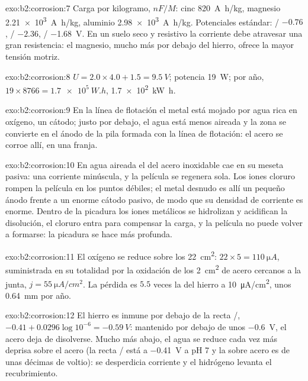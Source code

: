 \begin{solution}{exo:b2:corrosion:7}
Carga por kilogramo, $nF/M$: cinc \qty{820}{A.h/kg}, magnesio \qty{2.21e3}{A.h/kg},
aluminio \qty{2.98e3}{A.h/kg}. Potenciales estándar: / $-0.76$,
/ $-2.36$, / \qty{-1.68}{V}. En un suelo seco y resistivo
la corriente debe atravesar una gran resistencia: el magnesio, mucho más
por debajo del hierro, ofrece la mayor tensión motriz.
\end{solution}

\begin{solution}{exo:b2:corrosion:8}
$U = 2.0 \times 4.0 + 1.5 = \qty{9.5}{V}$; potencia \qty{19}{W}; por año, $19 \times
8766 = \qty{1.7e5}{W.h}$, \qty{1.7e2}{kW.h}.
\end{solution}

\begin{solution}{exo:b2:corrosion:9}
En la línea de flotación el metal está mojado por agua rica en oxígeno, un cátodo; justo
por debajo, el agua está menos aireada y la zona se convierte en el ánodo de la pila
formada con la línea de flotación: el acero se corroe allí, en una franja.
\end{solution}

\begin{solution}{exo:b2:corrosion:10}
En agua aireada el  del acero inoxidable cae en su
meseta pasiva: una corriente minúscula, y la película se regenera sola. Los iones cloruro rompen
la película en los puntos débiles; el metal desnudo es allí un pequeño ánodo frente a un
enorme cátodo pasivo, de modo que su densidad de corriente es enorme. Dentro de la picadura los
iones metálicos se hidrolizan y acidifican la disolución, el cloruro entra para compensar
la carga, y la película no puede volver a formarse: la picadura se hace más profunda.
\end{solution}

\begin{solution}{exo:b2:corrosion:11}
El oxígeno se reduce sobre los \qty{22}{cm^2}:  $22 \times 5 =
\qty{110}{\micro A}$, suministrada en su totalidad por la oxidación de los \qty{2}{cm^2} de acero
cercanos a la junta, $j = \qty{55}{\micro A/cm^2}$. La pérdida es $5.5$ veces la del hierro
a \qty{10}{\micro A/cm^2}, unos \qty{0.64}{mm} por año.
\end{solution}

\begin{solution}{exo:b2:corrosion:12}
El hierro es inmune por debajo de la recta /, $-0.41 + 0.0296\log 10^{-6} =
\qty{-0.59}{V}$: mantenido por debajo de unos \qty{-0.6}{V}, el acero deja de disolverse. Mucho
más abajo, el agua se reduce cada vez más deprisa sobre el acero (la recta / está a
\qty{-0.41}{V} a pH 7 y la  sobre acero es de unas décimas de voltio):
se desperdicia corriente y el hidrógeno levanta el recubrimiento.
\end{solution}

